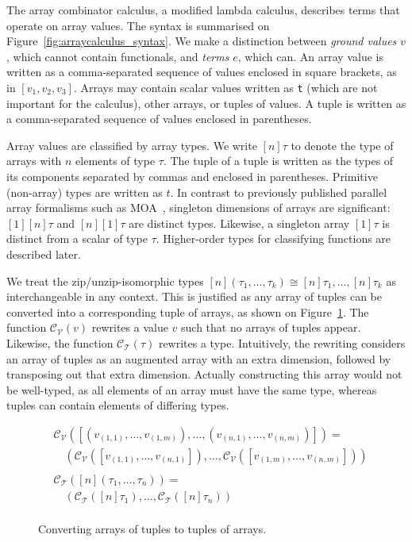 The array combinator calculus, a modified lambda calculus, describes
terms that operate on array values.  The syntax is summarised on
Figure~\ref{fig:arraycalculus_syntax}.  We make a distinction between
\textit{ground values}
$v$, which cannot contain functionals, and \textit{terms}
$e$, which can.  An array value is written as a comma-separated
sequence of values enclosed in square brackets, as in $[v_{1}, v_{2},
v_{3}]$.  Arrays may contain scalar values written as \texttt{t}
(which are not important for the calculus), other arrays, or tuples of
values.  A tuple is written as a comma-separated sequence of values
enclosed in parentheses.

Array values are classified by array types.  We write $[n]\tau$ to
denote the type of arrays with $n$ elements of type $\tau$.  The tuple
of a tuple is written as the types of its components separated by
commas and enclosed in parentheses.  Primitive (non-array) types are
written as $t$.  In contrast to previously published parallel array
formalisms such as MOA~\cite{moa}, singleton dimensions of arrays are
significant: $[1][n]\tau$ and $[n][1]\tau$ are distinct types.
Likewise, a singleton array $[1]\tau$ is distinct from a scalar of
type $\tau$.  Higher-order types for classifying functions are
described later.

\newcommand{\convV}[1]{\mathcal{C}_{\mathcal{V}}(#1)}
\newcommand{\convT}[1]{\mathcal{C}_{\mathcal{T}}(#1)}

We treat the zip/unzip-isomorphic types
$[n](\tau_1, \ldots, \tau_k) \cong [n]\tau_1 , \ldots , [n]\tau_k$ as
interchangeable in any context.  This is justified as any array of
tuples can be converted into a corresponding tuple of arrays, as shown
on Figure~\ref{fig:calc-tuple-transform}.  The function $\convV{v}$
rewrites a value $v$ such that no arrays of tuples appear.  Likewise,
the function $\convT{\tau}$ rewrites a type.  Intuitively, the
rewriting considers an array of tuples as an augmented array with an
extra dimension, followed by transposing out that extra dimension.
Actually constructing this array would not be well-typed, as all
elements of an array must have the same type, whereas tuples can
contain elements of differing types.

\begin{figure}
  \centering
  \begin{align*}
    &\convV{[(v_{(1,1)}, \ldots, v_{(1,m)}),\ldots,(v_{(n,1)}, \ldots, v_{(n,m)})]} =\\
    &\quad (\convV{[v_{(1,1)},\ldots,v_{(n,1)}]},\ldots,\convV{[v_{(1,m)},\ldots,v_{(n,m)}]})\\
    \\
    &\convT{[n](\tau_{1},\ldots,\tau_{n})} =\\
    &\quad(\convT{[n]\tau_{1}},\ldots,\convT{[n]\tau_{n}}) \\
  \end{align*}
  \caption{Converting arrays of tuples to tuples of arrays.}
  \label{fig:calc-tuple-transform}
\end{figure}

